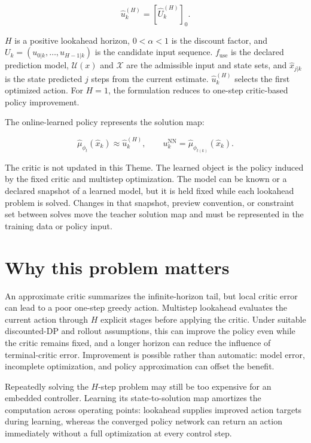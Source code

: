 \documentclass[a4paper]{article}
\begin{document}
\begin{equation}
  \widehat u_k^{(H)}
  =
  \left[\widehat U_k^{(H)}\right]_0 .
\end{equation}

$H$ is a positive lookahead horizon, $0<\alpha<1$ is the discount factor, and
$U_k=(u_{0|k},\ldots,u_{H-1|k})$ is the candidate input sequence.
$f_{\mathrm{use}}$ is the declared prediction model,
$\mathcal U(x)$ and $\mathcal X$ are the admissible input and state sets, and
$\widehat x_{j|k}$ is the state predicted $j$ steps from the current estimate.
$\widehat u_k^{(H)}$ selects the first optimized action. For $H=1$, the
formulation reduces to one-step critic-based policy improvement.

The online-learned policy represents the solution map:

\begin{equation}
  \widehat\mu_{\phi_t}(\widehat x_k)
  \approx
  \widehat u_k^{(H)},
  \qquad
  u_k^{\mathrm{NN}}
  =
  \widehat\mu_{\phi_{t(k)}}(\widehat x_k).
\end{equation}

The critic is not updated in this Theme. The learned object is the policy
induced by the fixed critic and multistep optimization. The model can be known
or a declared snapshot of a learned model, but it is held fixed while each
lookahead problem is solved. Changes in that snapshot, preview convention, or
constraint set between solves move the teacher solution map and must be
represented in the training data or policy input.

\section{Why this problem matters}

An approximate critic summarizes the infinite-horizon tail, but local critic
error can lead to a poor one-step greedy action. Multistep lookahead evaluates
the current action through $H$ explicit stages before applying the critic.
Under suitable discounted-DP and rollout assumptions, this can improve the
policy even while the critic remains fixed, and a longer horizon can reduce
the influence of terminal-critic error. Improvement is possible rather than
automatic: model error, incomplete optimization, and policy approximation can
offset the benefit.

Repeatedly solving the $H$-step problem may still be too expensive for an
embedded controller. Learning its state-to-solution map amortizes the
computation across operating points: lookahead supplies improved action
targets during learning, whereas the converged policy network can return an
action immediately without a full optimization at every control step.
\end{document}
